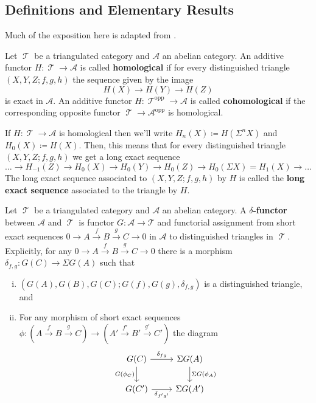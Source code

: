 \documentclass[11pt]{article}
\DeclareMathOperator{\TT}{\mathcal{T}}
\begin{document}
\subsection{Definitions and Elementary Results}

Much of the exposition here is adapted from \cite[\href{https://stacks.math.columbia.edu/tag/05QN}{Section 05QN}]{stacks-project}.


\begin{defn}
Let $\TT$ be a triangulated category and $\mathcal{A}$ an abelian category. An additive functor $H: \TT \to \mathcal{A}$ is called \textbf{homological} if for every distinguished triangle $(X,Y,Z; f,g,h)$ the sequence given by the image
\[
	H(X) \to H(Y) \to H(Z)
\]
is exact in $\mathcal{A}$. An additive functor $H: \TT^{\text{opp}} \to \mathcal{A}$ is called \textbf{cohomological} if the corresponding opposite functor $\TT \to \mathcal{A}^{\text{opp}}$ is homological.

If $H: \TT \to \mathcal{A}$ is homological then we'll write $H_n(X) \coloneqq H(\Sigma^n X)$ and $H_0(X) \coloneqq H(X)$. Then, this means that for every distinguished triangle $(X,Y,Z; f,g,h)$ we get a long exact sequence 
\[
	\hdots \to H_{-1}(Z) \to H_{0}(X) \to H_0(Y) \to H_0(Z) \to H_0(\Sigma X) = H_1(X) \to \hdots
\]
The long exact sequence associated to $(X,Y,Z; f,g,h)$ by $H$ is called the \textbf{long exact sequence} associated to the triangle by $H$.
\end{defn}

\begin{defn}
Let $\TT$ be a triangulated category and $\mathcal{A}$ an abelian category. A \textbf{$\delta$-functor} between $\mathcal{A}$ and $\TT$ is functor $G: \mathcal{A} \to \mathcal{T}$ and functorial assignment from short exact sequences $0 \to A \xrightarrow{f} B \xrightarrow{g} C \to 0$ in $\mathcal{A}$ to distinguished triangles in $\TT$. Explicitly, for any $0 \to A \xrightarrow{f} B \xrightarrow{g} C \to 0$ there is a morphism $\delta_{f,g}: G(C) \to \Sigma G(A)$ such that
\begin{enumerate}[i.]
	\item $(G(A),G(B),G(C); G(f),G(g),\delta_{f,g})$ is a distinguished triangle, and
	\item For any morphism of short exact sequences $\phi: (A \xrightarrow{f} B \xrightarrow{g} C) \to (A' \xrightarrow{f'} B' \xrightarrow{g'} C')$ the diagram 
		\[\begin{tikzcd}
G(C) \ar[r,"\delta_{fg}"] \ar[d,"G(\phi_C)"'] & \Sigma G(A) \ar[d,"\Sigma G(\phi_A)"] \\
G(C') \ar[r,"\delta_{f'g'}"'] & \Sigma G(A') \\
		\end{tikzcd}\]
\end{enumerate}
\end{defn}
\end{document}
